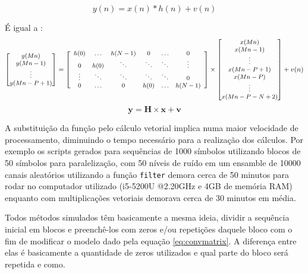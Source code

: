 \documentclass[a4paper,twoside]{articlewithlogo}
\begin{document}
\begin{equation*}
y(n)=x(n)\ast h(n) + v(n)
\end{equation*} 

É igual a :
\begin{equation}\small
\left[\begin{matrix}
y(Mn) \\ 
y(Mn-1) \\ 
\vdots \\ 
y(Mn-P+1) \\ 
\end{matrix} \right] =  \left[\begin{array}{cccccc}
h(0) & \hdots & h(N-1) & 0 & \hdots & 0  \\ 
0 & h(0) & \ddots & \ddots & \ddots & \vdots  \\ 
\vdots & \ddots & \ddots & \ddots & \ddots & 0  \\ 
0 & \hdots & 0 & h(0) & \hdots & h(N-1)  \\ 
\end{array}\right] \times  \left[\begin{matrix}
x(Mn) \\ 
x(Mn-1) \\ 
\vdots \\ 
x(Mn-P+1) \\ 
x(Mn-P) \\ 
\vdots \\
x(Mn-P-N+2)
\end{matrix} \right]+v(n)
\label{eq:convmatrix}
\end{equation}
\begin{equation*}
\textbf{y}=\textbf{H}\times \textbf{x} + \textbf{v}
\end{equation*}

A substituição da função pelo cálculo vetorial implica numa maior velocidade de processamento, diminuindo o tempo necessário para a realização dos cálculos. Por exemplo os scripts gerados para sequências de 1000 símbolos utilizando blocos de 50 símbolos para paralelização, com 50 níveis de ruído em um ensamble de 10000 canais aleatórios utilizando a função \verb|filter| demora cerca de 50 minutos para rodar no computador utilizado (i5-5200U @2.20GHz e 4GB de memória RAM) enquanto com multiplicações vetoriais demorava cerca de 30 minutos em média.

Todos métodos simulados têm basicamente a mesma ideia, dividir a sequência inicial em blocos e preenchê-los com zeros e/ou repetições daquele bloco com o fim de modificar o modelo dado pela equação \eqref{eq:convmatrix}. A diferença entre elas é basicamente a quantidade de zeros utilizados e qual parte do bloco será repetida e como.
\end{document}
